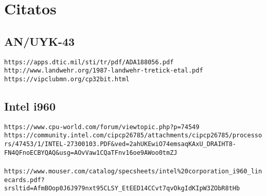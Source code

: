 \documentclass{article}
\begin{document}
\section{Citatos}
\subsection{AN/UYK-43}
\verb|https://apps.dtic.mil/sti/tr/pdf/ADA188056.pdf|
\\
\verb|http://www.landwehr.org/1987-landwehr-tretick-etal.pdf|
\\
\verb|https://vipclubmn.org/cp32bit.html|

\subsection{Intel i960}
\verb|https://www.cpu-world.com/forum/viewtopic.php?p=74549|
\\
\verb|https://community.intel.com/cipcp26785/attachments/cipcp26785/processors/47453/1/INTEL-27300103.PDF&ved=2ahUKEwiO74emsaqKAxU_DRAIHT8-FN4QFnoECBYQAQ&usg=AOvVaw1CQaTFnv16oe9AWoo0tmZJ|
\\
\\
\verb|https://www.mouser.com/catalog/specsheets/intel%20corporation_i960_linecards.pdf?srsltid=AfmBOop0J6J979nxt95CLSY_EtEED14CCvt7qvOkgIdKIpW3ZObR8tHb|
\end{document}

